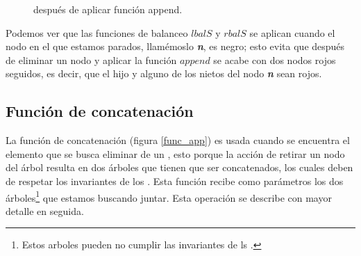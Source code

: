 \begin{figure}
\centering
\captionsetup{justification=centering}
\caption{{\Arn} después de aplicar función append.}
\label{arbolRB_6}
\end{figure}

Podemos ver que las funciones de balanceo $lbalS$ y $rbalS$ se aplican cuando el nodo en el que
estamos parados, llamémoslo \textbf{\textit{n}}, es negro; esto evita que después de eliminar un 
nodo y aplicar la funci\'on $append$ se acabe con dos nodos rojos seguidos, es decir, que el hijo y 
alguno de los nietos del nodo \textbf{\textit{n}} sean rojos.

\subsection{Funci\'on de concatenaci\'on}

La funci\'on de concatenación (figura \ref{func_app}) es usada cuando se encuentra el elemento que
se busca eliminar de un {\arn}, esto porque la acci\'on de retirar un nodo del \'arbol resulta
en dos \'arboles que tienen que ser concatenados, los cuales deben de respetar los invariantes de
los {\arns}. Esta funci\'on recibe como parámetros los dos \'arboles\footnote{Estos arboles pueden
no cumplir las invariantes de ls {\arns}.} que estamos buscando juntar. Esta operación se describe
con mayor detalle en seguida.

